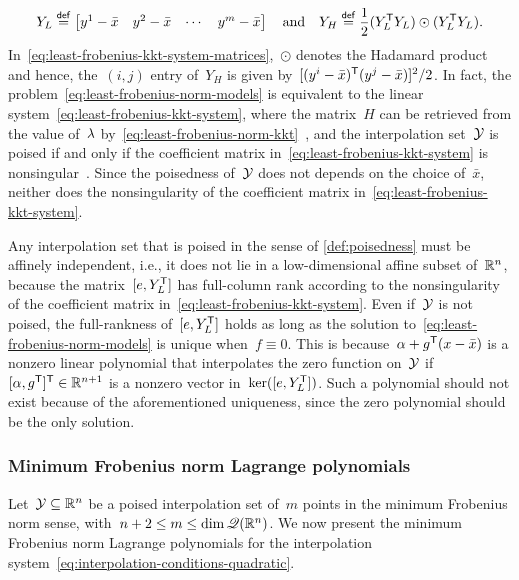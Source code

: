 \begin{equation}
    \label{eq:least-frobenius-kkt-system-matrices}
    Y_L \mathrel{\stackrel{\mathsf{def}}{=}} 
    \begin{bmatrix}
        y^1 - \bar{x}   & y^2 - \bar{x} & \cdots    & y^m - \bar{x}
    \end{bmatrix} \quad \text{and} \quad Y_H \mathrel{\stackrel{\mathsf{def}}{=}} \frac{1}{2} (Y_L^{\mathsf{T}} Y_L) \odot (Y_L^{\mathsf{T}} Y_L).
\end{equation}
In~\cref{eq:least-frobenius-kkt-system-matrices},~$\odot$ denotes the Hadamard product and hence, the~$(i, j)$ entry of~$Y_H$ is given by~$[(y^i - \bar{x})^{\mathsf{T}} (y^j - \bar{x})]^2 / 2$.
In fact, the problem~\cref{eq:least-frobenius-norm-models} is equivalent to the linear system~\cref{eq:least-frobenius-kkt-system}, where the matrix~$H$ can be retrieved from the value of~$\lm$ by~\cref{eq:least-frobenius-norm-kkt}~\cite[\S~2]{Powell_2004b}, and the interpolation set~$\xpt$ is poised if and only if the coefficient matrix in~\cref{eq:least-frobenius-kkt-system} is nonsingular~\cite[\S~5.3]{Conn_Scheinberg_Vicente_2009b}.
Since the poisedness of~$\xpt$ does not depends on the choice of~$\bar{x}$, neither does the nonsingularity of the coefficient matrix in~\cref{eq:least-frobenius-kkt-system}.

Any interpolation set that is poised in the sense of \cref{def:poisedness} must be affinely independent, i.e., it does not lie in a low-dimensional affine subset of~$\mathbb{R}^n$, because the matrix~$[e, Y_L^{\mathsf{T}}]$ has full-column rank according to the nonsingularity of the coefficient matrix in~\cref{eq:least-frobenius-kkt-system}.
Even if~$\xpt$ is not poised, the full-rankness of~$[e, Y_L^{\mathsf{T}}]$ holds as long as the solution to~\cref{eq:least-frobenius-norm-models} is unique when~$f \equiv 0$.
This is because~$\alpha + g^{\T} (\iter - \bar{x})$ is a nonzero linear polynomial that interpolates the zero function on~$\xpt$ if~$[\alpha, g^{\mathsf{T}}]^{\mathsf{T}} \in \mathbb{R}^{n + 1}$ is a nonzero vector in~$\ker([e, Y_L^{\mathsf{T}}])$.
Such a polynomial should not exist because of the aforementioned uniqueness, since the zero polynomial should be the only solution.

\subsubsection{Minimum Frobenius norm Lagrange polynomials}

Let~$\xpt \subseteq \R^n$ be a poised interpolation set of~$m$ points in the minimum Frobenius norm sense, with~$n + 2 \le m \le \dim \mathscr{Q}(\mathbb{R}^n)$.
We now present the minimum Frobenius norm Lagrange polynomials for the interpolation system~\cref{eq:interpolation-conditions-quadratic}.

